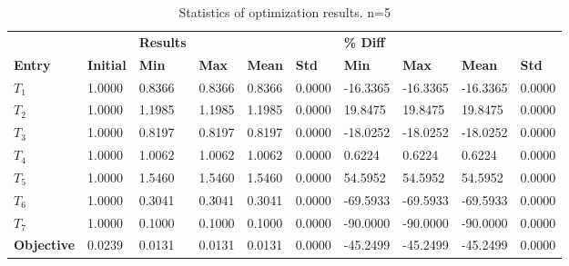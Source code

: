 \begin{table}[H]
\centering
\begin{tabular}{llllllllll}
\textbf{} & \textbf{} & \cellcolor[HTML]{EFEFEF}\textbf{Results} & \cellcolor[HTML]{EFEFEF} & \cellcolor[HTML]{EFEFEF} & \cellcolor[HTML]{EFEFEF} & \cellcolor[HTML]{EFEFEF}\textbf{\% Diff} & \cellcolor[HTML]{EFEFEF} & \cellcolor[HTML]{EFEFEF} & \cellcolor[HTML]{EFEFEF} \\
\rowcolor[HTML]{EFEFEF} 
\textbf{Entry} & \textbf{Initial} & \textbf{Min} & \textbf{Max} & \textbf{Mean} & \textbf{Std} & \textbf{Min} & \textbf{Max} & \textbf{Mean} & \textbf{Std} \\
$T_1$ & 1.0000 & 0.8366 & 0.8366 & 0.8366 & 0.0000 & -16.3365 & -16.3365 & -16.3365 & 0.0000 \\ 
$T_2$ & 1.0000 & 1.1985 & 1.1985 & 1.1985 & 0.0000 & 19.8475 & 19.8475 & 19.8475 & 0.0000 \\ 
$T_3$ & 1.0000 & 0.8197 & 0.8197 & 0.8197 & 0.0000 & -18.0252 & -18.0252 & -18.0252 & 0.0000 \\ 
$T_4$ & 1.0000 & 1.0062 & 1.0062 & 1.0062 & 0.0000 & 0.6224 & 0.6224 & 0.6224 & 0.0000 \\ 
$T_5$ & 1.0000 & 1.5460 & 1.5460 & 1.5460 & 0.0000 & 54.5952 & 54.5952 & 54.5952 & 0.0000 \\ 
$T_6$ & 1.0000 & 0.3041 & 0.3041 & 0.3041 & 0.0000 & -69.5933 & -69.5933 & -69.5933 & 0.0000 \\ 
$T_7$ & 1.0000 & 0.1000 & 0.1000 & 0.1000 & 0.0000 & -90.0000 & -90.0000 & -90.0000 & 0.0000 \\ 
\rowcolor[HTML]{EFEFEF} 
\textbf{Objective} & 0.0239 & 0.0131 & 0.0131 & 0.0131 & 0.0000 & -45.2499 & -45.2499 & -45.2499 & 0.0000 \\ 
\end{tabular}
\caption{Statistics of optimization results. n=5}
\label{tab:StatisticsOptimizationAnalysis}
\end{table}